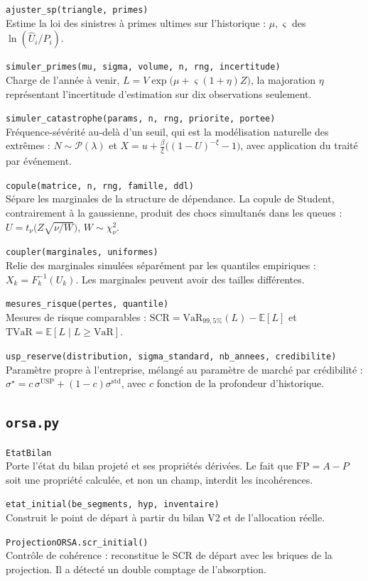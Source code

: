 \documentclass[10pt,a4paper]{article}
\newcommand{\fn}[2]{\par\smallskip\textcolor{bleufonce}{\texttt{#1}}\\ #2\par}
\begin{document}
\fn{ajuster\_sp(triangle, primes)}{Estime la loi des sinistres à primes ultimes sur l'historique :
$\mu, \varsigma$ des $\ln(\hat U_i / P_i)$.}

\fn{simuler\_primes(mu, sigma, volume, n, rng, incertitude)}{Charge de l'année à venir,
$L = V \exp\bigl(\mu + \varsigma(1+\eta)Z\bigr)$, la majoration $\eta$ représentant l'incertitude
d'estimation sur dix observations seulement.}

\fn{simuler\_catastrophe(params, n, rng, priorite, portee)}{Fréquence-sévérité au-delà d'un
seuil, qui est la modélisation naturelle des extrêmes :
$N \sim \mathcal{P}(\lambda)$ et
$X = u + \frac{\beta}{\xi}\bigl((1-U)^{-\xi} - 1\bigr)$, avec application du traité par
événement.}

\fn{copule(matrice, n, rng, famille, ddl)}{Sépare les marginales de la structure de dépendance.
La copule de Student, contrairement à la gaussienne, produit des chocs simultanés dans les
queues : $U = t_\nu\bigl(Z\sqrt{\nu/W}\bigr)$, $W \sim \chi^2_\nu$.}

\fn{coupler(marginales, uniformes)}{Relie des marginales simulées séparément par les quantiles
empiriques : $X_k = F_k^{-1}(U_k)$. Les marginales peuvent avoir des tailles différentes.}

\fn{mesures\_risque(pertes, quantile)}{Mesures de risque comparables :
$\mathrm{SCR} = \mathrm{VaR}_{99{,}5\%}(L) - \mathbb{E}[L]$ et
$\mathrm{TVaR} = \mathbb{E}[L \mid L \ge \mathrm{VaR}]$.}

\fn{usp\_reserve(distribution, sigma\_standard, nb\_annees, credibilite)}{Paramètre propre à
l'entreprise, mélangé au paramètre de marché par crédibilité :
$\sigma^{\star} = c\,\sigma^{\mathrm{USP}} + (1-c)\sigma^{\text{std}}$, avec $c$ fonction de la
profondeur d'historique.}

\subsection{\texttt{orsa.py}}

\fn{EtatBilan}{Porte l'état du bilan projeté et ses propriétés dérivées. Le fait que
$\mathrm{FP} = A - P$ soit une propriété calculée, et non un champ, interdit les incohérences.}

\fn{etat\_initial(be\_segments, hyp, inventaire)}{Construit le point de départ à partir du bilan
V2 et de l'allocation réelle.}

\fn{ProjectionORSA.scr\_initial()}{Contrôle de cohérence : reconstitue le SCR de départ avec les
briques de la projection. Il a détecté un double comptage de l'absorption.}
\end{document}
